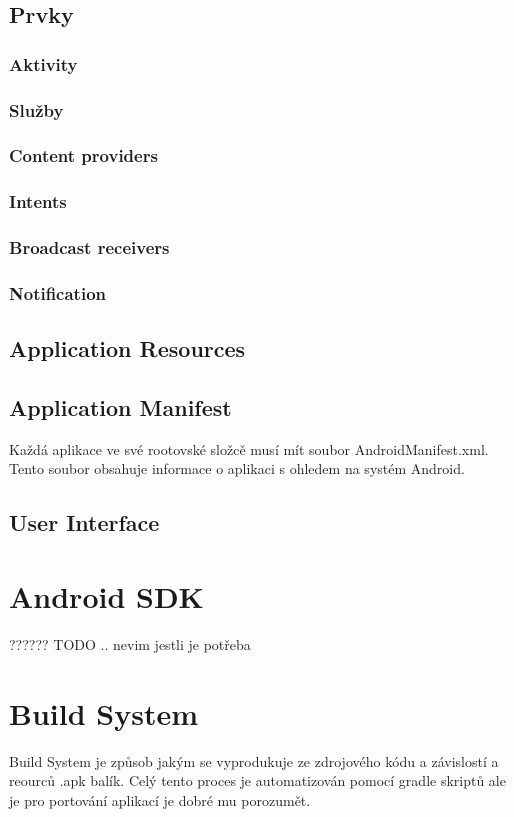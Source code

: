 \subsection{Prvky}
\subsubsection{Aktivity}
\subsubsection{Služby}
\subsubsection{Content providers}
\subsubsection{Intents}
\subsubsection{Broadcast receivers}
\subsubsection{Notification}

\subsection{Application Resources}
\subsection{Application Manifest} %
Každá aplikace ve své rootovské složcě musí mít soubor AndroidManifest.xml. Tento soubor obsahuje informace o aplikaci s ohledem na systém Android. 
\subsection{User Interface}

\section{Android SDK}
?????? TODO .. nevim jestli je potřeba
\section{Build System}%
Build System je způsob jakým se vyprodukuje ze zdrojového kódu a závislostí a reourců .apk balík. Celý tento proces je automatizován pomocí gradle skriptů ale je pro portování aplikací je dobré mu porozumět.

